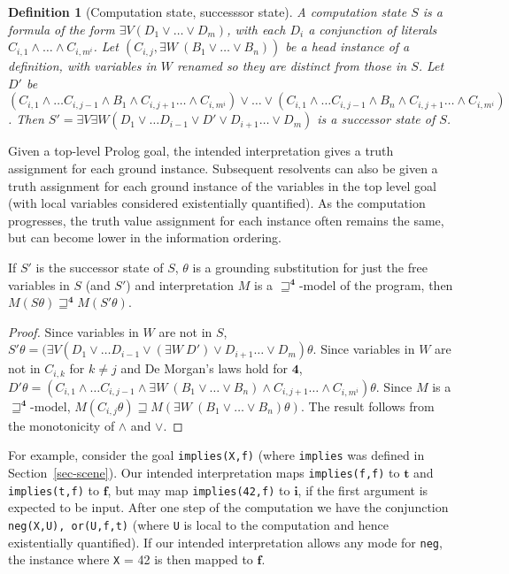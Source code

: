 \documentclass{tlp}
\newtheorem{definition}{Definition}
\newcommand{\Quad}{\ensuremath{\mathbf{4}}}
\begin{document}
\begin{definition}[Computation state, successsor state]
A computation state $S$ is a formula of the form
$\exists {V} (D_1 \vee \ldots \vee D_m)$, with each $D_i$
a conjunction of literals
$C_{i,1} \wedge \ldots \wedge C_{i,m^i}$.
Let $(C_{i,j}, \exists {W}~ (B_1 \vee \ldots \vee B_n))$ be a
head instance of a definition, with variables in ${W}$
renamed so they are distinct from those in $S$.
Let $D'$ be
$(C_{i,1} \wedge \ldots C_{i,j-1} \wedge B_1 \wedge C_{i,j+1} \ldots
\wedge C_{i,m^i}) \vee \ldots \vee
(C_{i,1} \wedge \ldots C_{i,j-1} \wedge B_n \wedge C_{i,j+1} \ldots
\wedge C_{i,m^i})$.  Then
$S' = \exists {V} \exists {W} (D_1 \vee \ldots D_{i-1} \vee D' \vee
D_{i+1} \ldots \vee D_m)$ is a successor state of $S$.
\end{definition}

Given a top-level Prolog goal, the intended interpretation gives a
truth assignment for each ground instance.  Subsequent resolvents can
also be given a truth assignment for each ground instance of the
variables in the top level goal (with local variables considered
existentially quantified).  As the computation progresses, the
truth value assignment for each instance often remains the same,
but can become lower in the information ordering.

\pagebreak
\begin{proposition}
\label{prop-comp-order}
If $S'$ is the successor state of $S$, $\theta$ is a grounding
substitution for just the free variables in $S$ (and $S'$) and
interpretation $M$ is a $\sqsupseteq^\Quad$-model of the program,
then $M(S \theta) \sqsupseteq^\Quad M(S' \theta)$.
\end{proposition}
\begin{proof}
Since variables in ${W}$ are not in $S$, $S' \theta =
(\exists {V} (D_1 \vee \ldots D_{i-1} \vee (\exists {W}~D')  \vee
D_{i+1} \ldots \vee D_m) \theta$.
Since variables in ${W}$ are not in $C_{i,k}$ for $k \ne j$
and De Morgan's laws hold for \Quad, $D' \theta = 
(C_{i,1} \wedge \ldots C_{i,j-1} \wedge
\exists {W}~(B_1 \vee \ldots \vee B_n) \wedge C_{i,j+1} \ldots
\wedge C_{i,m^i}) \theta$.
Since $M$ is a $\sqsupseteq^\Quad$-model, $ M(C_{i,j} \theta) \sqsupseteq
M(\exists {W}~ (B_1 \vee \ldots \vee B_n) \theta)$.
The result follows from the monotonicity of $\wedge$ and $\vee$.
\end{proof}
For example, consider the goal \texttt{implies(X,f)}
(where \verb!implies! was defined in Section~\ref{sec-scene}). 
Our intended interpretation maps
\texttt{implies(f,f)} to $\mathbf{t}$ and \texttt{implies(t,f)} to
$\mathbf{f}$, but may map \texttt{implies(42,f)} to $\mathbf{i}$, if the
first argument is expected to be input.  After one step of the computation
we have the conjunction \texttt{neg(X,U), or(U,f,t)}
(where \texttt{U} is local to the computation and hence existentially
quantified).
If our intended interpretation allows any mode for \texttt{neg}, the
instance where \texttt{X} = 42 is then mapped to $\mathbf{f}$.
\end{document}
